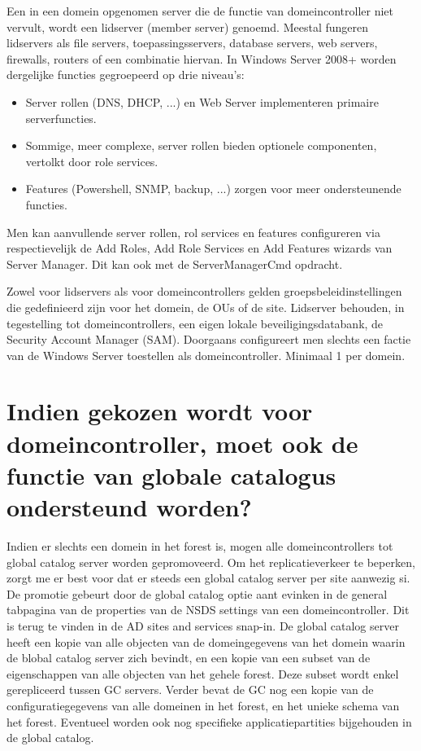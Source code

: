 Een in een domein opgenomen server die de functie van domeincontroller niet
vervult, wordt een lidserver (member server) genoemd. Meestal fungeren
lidservers als file servers, toepassingsservers, database servers, web servers,
firewalls, routers of een combinatie hiervan. In Windows Server 2008+ worden
dergelijke functies gegroepeerd op drie niveau's:
\begin{itemize}
	\item Server rollen (DNS, DHCP, ...) en Web Server implementeren
		primaire serverfuncties.
	\item Sommige, meer complexe, server rollen bieden optionele
		componenten, vertolkt door role services.
	\item Features (Powershell, SNMP, backup, ...) zorgen voor meer
		ondersteunende functies.
\end{itemize}
Men kan aanvullende server rollen, rol services en features configureren via
respectievelijk de Add Roles, Add Role Services en Add Features wizards van
Server Manager. Dit kan ook met de ServerManagerCmd opdracht.

Zowel voor lidservers als voor domeincontrollers gelden groepsbeleidinstellingen
die gedefinieerd zijn voor het domein, de OUs of de site. Lidserver behouden, in
tegestelling tot domeincontrollers, een eigen lokale beveiligingsdatabank, de
Security Account Manager (SAM).
Doorgaans configureert men slechts een factie van de Windows Server toestellen
als domeincontroller. Minimaal 1 per domein.

\section{Indien gekozen wordt voor domeincontroller, moet ook de functie van
globale catalogus ondersteund worden?}

Indien er slechts een domein in het forest is, mogen alle domeincontrollers tot
global catalog server worden gepromoveerd. Om het replicatieverkeer te beperken,
zorgt me er best voor dat er steeds een global catalog server per site aanwezig
si. De promotie gebeurt door de global catalog optie aant evinken in de general
tabpagina van de properties van de NSDS settings van een domeincontroller. Dit
is terug te vinden in de AD sites and services snap-in. De global catalog server
heeft een kopie van alle objecten van de domeingegevens van het domein waarin de
blobal catalog server zich bevindt, en een kopie van een subset van de
eigenschappen van alle objecten van het gehele forest. Deze subset wordt enkel
gerepliceerd tussen GC servers. Verder bevat de GC nog een kopie van de
configuratiegegevens van alle domeinen in het forest, en het unieke schema van
het forest. Eventueel worden ook nog specifieke applicatiepartities bijgehouden
in de global catalog.

